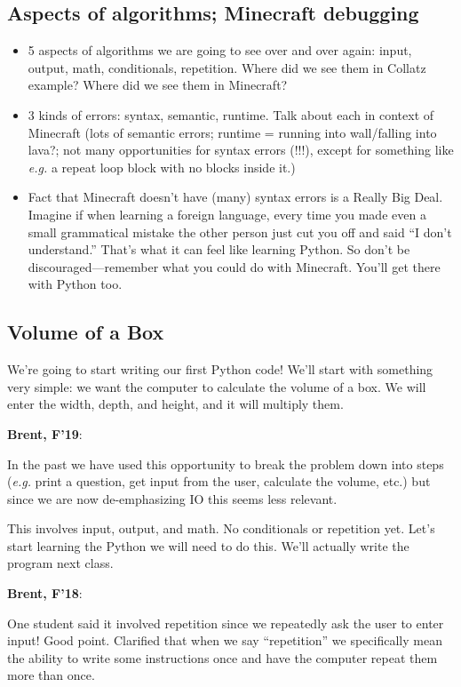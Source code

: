 \documentclass{article}
\newcommand{\eg}{\emph{e.g.}\xspace}
\newenvironment{reflect}[1]
{
  \noindent
  \begin{lrbox}{\reflectbox}
    \begin{minipage}[t]{\textwidth}
      \textbf{#1}:
}{
    \end{minipage}
  \end{lrbox}
  \fbox{\usebox{\reflectbox}}
}
\begin{document}
\subsection*{Aspects of algorithms; Minecraft debugging}

\begin{itemize}
\item 5 aspects of algorithms we are going to see over and over again:
  input, output, math, conditionals, repetition.  Where did we see
  them in Collatz example?  Where did we see them in Minecraft?
\item 3 kinds of errors: syntax, semantic, runtime.  Talk
  about each in context of Minecraft (lots of semantic errors; runtime
  = running into wall/falling into lava?; not many opportunities for
  syntax errors (!!!), except for something like \eg a repeat loop
  block with no blocks inside it.)
\item Fact that Minecraft doesn't have (many) syntax errors is a
  Really Big Deal.  Imagine if when learning a foreign language, every
  time you made even a small grammatical mistake the other person just
  cut you off and said ``I don't understand.''  That's what it can
  feel like learning Python.  So don't be discouraged---remember what
  you could do with Minecraft.  You'll get there with Python too.
\end{itemize}

\subsection*{Volume of a Box}

We're going to start writing our first Python code!  We'll start with
something very simple: we want the computer to calculate the volume of
a box.  We will enter the width, depth, and height, and it will
multiply them.

\begin{reflect}{Brent, F'19}
  In the past we have used this opportunity to break the problem down
  into steps (\emph{e.g.} print a question, get input from the user,
  calculate the volume, etc.) but since we are now de-emphasizing IO
  this seems less relevant.
\end{reflect}

This involves input, output, and math.  No conditionals or repetition
yet.  Let's start learning the Python we will need to do this.  We'll
actually write the program next class.

\begin{reflect}{Brent, F'18}
  One student said it involved repetition since we repeatedly ask the
  user to enter input!  Good point.  Clarified that when we say
  ``repetition'' we specifically mean the ability to write some
  instructions once and have the computer repeat them more than once.
\end{reflect}
\end{document}

